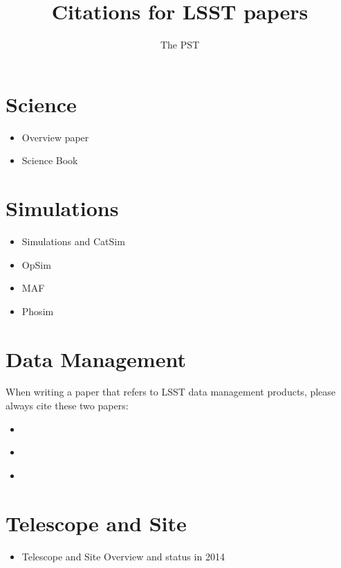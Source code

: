 \documentclass[12pt]{article}
\begin{document}
\title{Citations for LSST papers}
\author{The PST}
\maketitle

\tableofcontents


\section{Science}
\begin{itemize}
\item Overview paper \cite{ivezic2008lsst}

\item Science Book \cite{abell2009lsst}
\end{itemize}

\section{Simulations}

\begin{itemize}
\item Simulations and CatSim \cite{2014SPIE.9150E..14C}
 
\item OpSim \cite{2014SPIE.9150E..15D}

\item MAF \cite{2014SPIE.9149E..0BJ}

\item Phosim \cite{2015arXiv150406570P}
\end{itemize}

\section{Data Management}
When writing a paper that refers to LSST data management products, please always cite these two papers:

\begin{itemize}
   \item \cite{ivezic2008lsst}

  \item \cite{DPDD}

  \item \cite{DMDesign}
\end{itemize}
 
\section{Telescope and Site}

\begin{itemize}
   \item Telescope and Site Overview and status in 2014 \cite{2014SPIE.9145E..1AG}
\end{itemize}


\printbibliography[heading=bibintoc]
\end{document}
